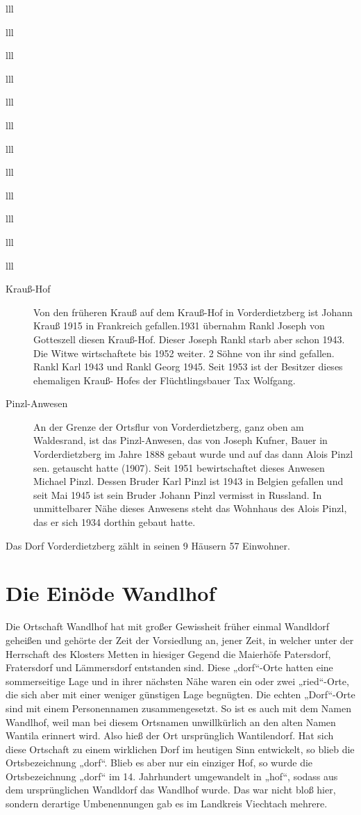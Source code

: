 \documentclass[12pt,a4pager]{book}
\begin{document}
\begin{tabuluar}{lll}
\begin{tabuluar}{lll}
\begin{tabuluar}{lll}
\begin{tabuluar}{lll}
\begin{tabuluar}{lll}
\begin{tabuluar}{lll}
\begin{tabuluar}{lll}
\begin{tabuluar}{lll}
\begin{tabuluar}{lll}
\begin{tabuluar}{lll}
\begin{tabuluar}{lll}
\begin{tabuluar}{lll}
\begin{description}
\item[Krauß-Hof] Von den früheren Krauß auf dem Krauß-Hof in Vorderdietzberg
ist Johann Krauß 1915 in Frankreich gefallen.1931 übernahm Rankl Joseph von
Gotteszell diesen Krauß-Hof. Dieser Joseph Rankl starb aber schon 1943. Die
Witwe wirtschaftete bis 1952 weiter. 2 Söhne von ihr sind gefallen. Rankl Karl
1943 und Rankl Georg 1945. Seit 1953 ist der Besitzer dieses ehemaligen Krauß-
Hofes der Flüchtlingsbauer Tax Wolfgang.

\item[Pinzl-Anwesen] An der Grenze der Ortsflur von Vorderdietzberg, ganz oben
am Waldesrand, ist das Pinzl-Anwesen, das von Joseph Kufner, Bauer in
Vorderdietzberg im Jahre 1888 gebaut wurde und auf das dann Alois Pinzl sen.
getauscht hatte (1907). Seit 1951 bewirtschaftet dieses Anwesen Michael Pinzl.
Dessen Bruder Karl Pinzl ist 1943 in Belgien gefallen und seit Mai 1945 ist sein
Bruder Johann Pinzl vermisst in Russland. In unmittelbarer Nähe dieses Anwesens
steht das Wohnhaus des Alois Pinzl, das er sich 1934 dorthin gebaut hatte.
\end{description}

Das Dorf Vorderdietzberg zählt in seinen 9 Häusern 57 Einwohner.

\section{Die Einöde Wandlhof}

Die Ortschaft Wandlhof hat mit großer Gewissheit früher einmal Wandldorf
geheißen und gehörte der Zeit der Vorsiedlung an, jener Zeit, in welcher unter
der Herrschaft des Klosters Metten in hiesiger Gegend die Maierhöfe Patersdorf,
Fratersdorf und Lämmersdorf entstanden sind. Diese „dorf“-Orte hatten eine
sommerseitige Lage und in ihrer nächsten Nähe waren ein oder zwei „ried“-Orte,
die sich aber mit einer weniger günstigen Lage begnügten. Die echten „Dorf“-Orte
sind mit einem Personennamen zusammengesetzt. So ist es auch mit dem Namen
Wandlhof, weil man bei diesem Ortsnamen unwillkürlich an den alten Namen Wantila
erinnert wird. Also hieß der Ort ursprünglich Wantilendorf. Hat sich diese
Ortschaft zu einem wirklichen Dorf im heutigen Sinn entwickelt, so blieb die
Ortsbezeichnung „dorf“. Blieb es aber nur ein einziger Hof, so wurde die
Ortsbezeichnung „dorf“ im 14. Jahrhundert umgewandelt in „hof“, sodass aus dem
ursprünglichen Wandldorf das Wandlhof wurde. Das war nicht bloß hier, sondern
derartige Umbenennungen gab es im Landkreis Viechtach mehrere.


\end{tabuluar}
\end{tabuluar}
\end{tabuluar}
\end{tabuluar}
\end{tabuluar}
\end{tabuluar}
\end{tabuluar}
\end{tabuluar}
\end{tabuluar}
\end{tabuluar}
\end{tabuluar}
\end{tabuluar}
\end{document}
